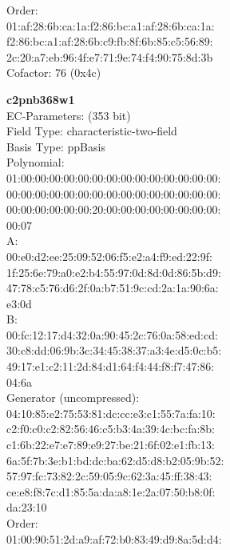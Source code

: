 Order: \\
    01:af:28:6b:ca:1a:f2:86:bc:a1:af:28:6b:ca:1a:\\
    f2:86:bc:a1:af:28:6b:c9:fb:8f:6b:85:c5:56:89:\\
    2c:20:a7:eb:96:4f:e7:71:9e:74:f4:90:75:8d:3b\\
Cofactor:  76 (0x4c)\\
\item \textbf{ c2pnb368w1 }\\
EC-Parameters: (353 bit)\\
Field Type: characteristic-two-field\\
Basis Type: ppBasis\\
Polynomial:\\
    01:00:00:00:00:00:00:00:00:00:00:00:00:00:00:\\
    00:00:00:00:00:00:00:00:00:00:00:00:00:00:00:\\
    00:00:00:00:00:00:20:00:00:00:00:00:00:00:00:\\
    00:07\\
A:   \\
    00:e0:d2:ee:25:09:52:06:f5:e2:a4:f9:ed:22:9f:\\
    1f:25:6e:79:a0:e2:b4:55:97:0d:8d:0d:86:5b:d9:\\
    47:78:c5:76:d6:2f:0a:b7:51:9c:cd:2a:1a:90:6a:\\
    e3:0d\\
B:   \\
    00:fc:12:17:d4:32:0a:90:45:2c:76:0a:58:ed:cd:\\
    30:c8:dd:06:9b:3c:34:45:38:37:a3:4e:d5:0c:b5:\\
    49:17:e1:c2:11:2d:84:d1:64:f4:44:f8:f7:47:86:\\
    04:6a\\
Generator (uncompressed):\\
    04:10:85:e2:75:53:81:dc:cc:e3:c1:55:7a:fa:10:\\
    c2:f0:c0:c2:82:56:46:c5:b3:4a:39:4c:bc:fa:8b:\\
    c1:6b:22:e7:e7:89:e9:27:be:21:6f:02:e1:fb:13:\\
    6a:5f:7b:3e:b1:bd:dc:ba:62:d5:d8:b2:05:9b:52:\\
    57:97:fc:73:82:2c:59:05:9c:62:3a:45:ff:38:43:\\
    ce:e8:f8:7c:d1:85:5a:da:a8:1e:2a:07:50:b8:0f:\\
    da:23:10\\
Order: \\
    01:00:90:51:2d:a9:af:72:b0:83:49:d9:8a:5d:d4:\\
